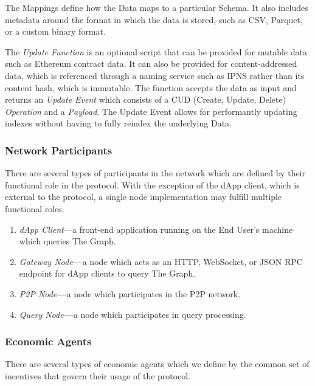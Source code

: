 \documentclass[12pt]{article}
\begin{document}
The Mappings define how the Data maps to a particular Schema. It also includes
metadata around the format in which the data is stored, such as CSV, Parquet, or
a custom binary format.

The \textit{Update Function} is an optional script that can be provided for
mutable data such as Ethereum contract data. It can also be provided for
content-addressed data, which is referenced through a naming service such as
IPNS rather than its content hash, which is immutable. The function accepts the
data as input and returns an \textit{Update Event} which consists of a CUD
(Create, Update, Delete) \textit{Operation} and a \textit{Payload}. The Update
Event allows for performantly updating indexes without having to fully reindex
the underlying Data.

\subsubsection*{Network Participants}

There are several types of participants in the network which are defined by
their functional role in the protocol. With the exception of the dApp client,
which is external to the protocol, a single node implementation may fulfill
multiple functional roles.

\begin{enumerate}
\item \textit{dApp Client}---a front-end application running on the End User's
  machine which queries The Graph.
\item \textit{Gateway Node}\textbf{---}a node which acts as an HTTP, WebSocket,
  or JSON RPC endpoint for dApp clients to query The Graph.
\item \textit{P2P Node}\textbf{---}a node which participates in the P2P network.
\item \textit{Query Node}\textbf{---}a node which participates in query
  processing.
\end{enumerate}

\subsubsection*{Economic Agents}

There are several types of economic agents which we define by the common set of
incentives that govern their usage of the protocol.
\end{document}
